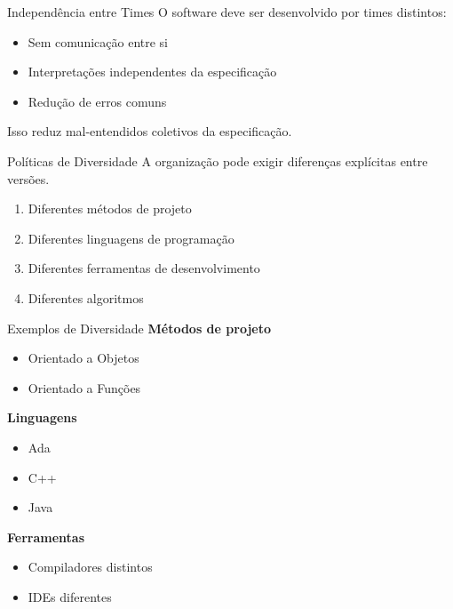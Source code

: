\documentclass[9pt]{beamer}
\begin{document}
\begin{frame}{Independência entre Times}
O software deve ser desenvolvido por times distintos:

\begin{itemize}
\item Sem comunicação entre si
\item Interpretações independentes da especificação
\item Redução de erros comuns
\end{itemize}

Isso reduz mal-entendidos coletivos da especificação.
\end{frame}


\begin{frame}{Políticas de Diversidade}
A organização pode exigir diferenças explícitas entre versões.

\begin{enumerate}
\item Diferentes métodos de projeto
\item Diferentes linguagens de programação
\item Diferentes ferramentas de desenvolvimento
\item Diferentes algoritmos
\end{enumerate}
\end{frame}


\begin{frame}{Exemplos de Diversidade}
\textbf{Métodos de projeto}
\begin{itemize}
\item Orientado a Objetos
\item Orientado a Funções
\end{itemize}

\textbf{Linguagens}
\begin{itemize}
\item Ada
\item C++
\item Java
\end{itemize}

\textbf{Ferramentas}
\begin{itemize}
\item Compiladores distintos
\item IDEs diferentes
\end{itemize}
\end{frame}
\end{document}

